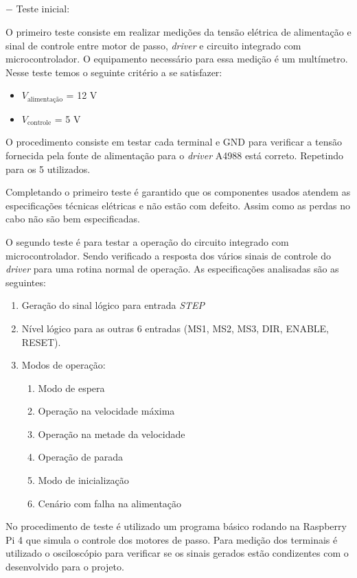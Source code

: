\subparagraph*{} $-$ Teste inicial:\label{sec:teste_inicial}

O primeiro teste consiste em realizar medições da tensão elétrica de alimentação e sinal de controle entre motor de passo, \textit{driver} e circuito integrado com microcontrolador.  O equipamento necessário para essa medição é um multímetro. Nesse teste temos o seguinte critério a se satisfazer:

\begin{itemize}
    \item $V_\text{alimentação}$ = 12 V
    \item $V_\text{controle}$ = 5 V 
\end{itemize}

O procedimento consiste em testar cada terminal e GND para verificar a tensão fornecida pela fonte de alimentação para o \textit{driver} A4988 está correto. Repetindo para os 5 utilizados.

Completando o primeiro teste é garantido que os componentes usados atendem as especificações técnicas elétricas e não estão com defeito. Assim como as perdas no cabo não são bem especificadas.

O segundo teste é para testar a operação do circuito integrado com microcontrolador. Sendo verificado a resposta dos vários sinais de controle do \textit{driver} para uma rotina normal de operação. As especificações analisadas são as seguintes:

\begin{enumerate}
    \item Geração do sinal lógico para entrada \textit{STEP}
    \item Nível lógico para as outras 6 entradas (MS1, MS2, MS3, DIR, ENABLE, RESET).
    \item Modos de operação:
    \begin{enumerate}
        \item Modo de espera
        \item Operação na velocidade máxima
        \item Operação na metade da velocidade
        \item Operação de parada
        \item Modo de inicialização
        \item Cenário com falha na alimentação
    \end{enumerate}
\end{enumerate}

No procedimento de teste é utilizado um programa básico rodando na Raspberry Pi 4 que simula o controle dos motores de passo. Para medição dos terminais é utilizado o osciloscópio para verificar se os sinais gerados estão condizentes com o desenvolvido para o projeto. 

